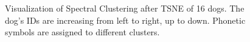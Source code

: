 \begin{figure}[htbp]
{\begin{minipage}[b]{.48\linewidth}
\end{minipage}
}
\caption{Visualization of Spectral Clustering after TSNE of 16 dogs. The dog's IDs are increasing from left to right, up to down. Phonetic symbols are assigned to different clusters. }
\label{fig:visualizationclusterall}
\end{figure}





